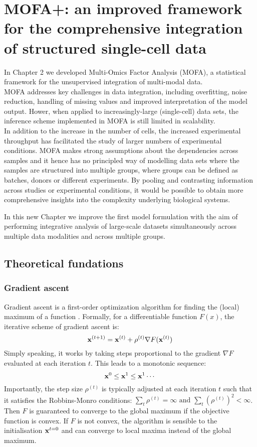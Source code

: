 \chapter{MOFA+: an improved framework for the comprehensive integration of structured single-cell data}

In Chapter 2 we developed Multi-Omics Factor Analysis (MOFA), a statistical framework for the unsupervised integration of multi-modal data. \\
MOFA addresses key challenges in data integration, including overfitting, noise reduction, handling of missing values and improved interpretation of the model output. Hower, when applied to increasingly-large (single-cell) data sets, the inference scheme implemented in MOFA is still limited in scalability. \\
In addition to the increase in the number of cells, the increased experimental throughput has facilitated the study of larger numbers of experimental conditions. MOFA makes strong assumptions about the dependencies across samples and it hence has no principled way of modelling data sets where the samples are structured into multiple groups, where groups can be defined as batches, donors or different experiments. By pooling and contrasting information across studies or experimental conditions, it would be possible to obtain more comprehensive insights into the complexity underlying biological systems.

In this new Chapter we improve the first model formulation with the aim of performing integrative analysis of large-scale datasets simultaneously across multiple data modalities and across multiple groups.

\section{Theoretical fundations}

\subsection{Gradient ascent} \label{section:gradient_ascent}

Gradient ascent is a first-order optimization algorithm for finding the (local) maximum of a function \cite{Bishop2006,Murphy}. Formally, for a differentiable function $F(x)$, the iterative scheme of gradient ascent is:
\begin{equation} \label{gradient_ascent}
	{\bf x}^{(t+1)} = {\bf x}^{(t)} + \rho^{(t)} \nabla F({\bf x}^{(t)})
\end{equation}
Simply speaking, it works by taking steps proportional to the gradient $\nabla F$ evaluated at each iteration $t$. This leads to a monotonic sequence:
\[
	{\bf x}^{0} \leq {\bf x}^{1} \leq {\bf x}^{1} \cdots 
\]
Importantly, the step size $\rho^{(t)}$ is typically adjusted at each iteration $t$ such that it satisfies the Robbins-Monro conditions: $\sum_t \rho^{(t)} = \infty \text{ and } \sum_t (\rho^{(t)})^2 < \infty$. Then $F$ is guaranteed to converge to the global maximum \cite{Robbins-Monro1951} if the objective function is convex. If $F$ is not convex, the algorithm is sensible to the initialisation ${\bf x}^{t=0}$ and can converge to local maxima instead of the global maximum.

